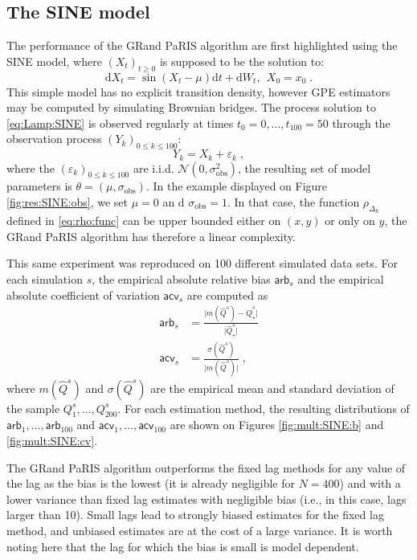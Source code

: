 \documentclass[12pt]{article}
\newcommand{\rmd}{\mathrm{d}}
\newcommand{\eqsp}{\;}
\newcommand{\1}{\mathrm{1}}
\newcommand{\hQ}{\widehat{Q}}
\begin{document}
\subsection*{The SINE model} 
The performance of the GRand PaRIS algorithm are first highlighted using the SINE model, where $(X_t)_{t\geq 0}$ is supposed to be the solution to: 
\begin{equation}
\rmd X_t = \sin \left(X_t-\mu\right)\rmd t + \rmd W_t,~~X_0=x_0\eqsp. \label{eq:Lamp:SINE}
\end{equation}
This simple model has no explicit transition density, however GPE estimators may be computed by simulating Brownian bridges.
The process solution to \eqref{eq:Lamp:SINE} is observed regularly at times $t_0=0,\ldots,t_{100}=50$ through the observation process $(Y_k)_{0\leq k \leq 100}$:
\begin{equation*}
Y_k = X_k + \varepsilon_k\eqsp,
\end{equation*}
where the $(\varepsilon_k)_{0\leq k \leq 100}$ are i.i.d. $\mathcal{N}(0, \sigma^2_\text{obs})$, the resulting set of model parameters is $\theta = (\mu, \sigma_\text{obs})$.
In the example displayed on Figure \ref{fig:res:SINE:obs}, we set $\mu=0$ an d $ \sigma_\text{obs} = 1$.
In that case, the function $\rho_{\Delta_k}$ defined in \eqref{eq:rho:func} can be upper bounded either on $(x,y)$ or only on $y$, the GRand PaRIS algorithm has therefore a linear complexity.


This same experiment was reproduced on 100 different simulated data sets. 
For each simulation $s$, the empirical absolute relative bias $\mathsf{arb}_s$ and the empirical absolute coefficient of variation $\mathsf{acv}_s$ are computed as
\begin{align*}
\mathsf{arb}_s &= \frac{\vert m(\hQ^s)-\hQ^s_\star\vert }{\vert \hQ^s_\star\vert }\\
\mathsf{acv}_s&=\frac{\sigma(\hQ^s)}{\vert m(\hQ^s)\vert }\eqsp,
\end{align*}
where $m(\hQ^s)$ and $\sigma(\hQ^s)$ are the empirical mean and standard deviation of the sample $Q_1^s,\dots,Q_{200}^s$. For each estimation method, the resulting distributions of $\mathsf{arb}_1,\dots,\mathsf{arb}_{100}$ and $\mathsf{acv}_1,\dots,\mathsf{acv}_{100}$  are shown on Figures \ref{fig:mult:SINE:b} and  \ref{fig:mult:SINE:cv}.


The GRand PaRIS algorithm outperforms the fixed lag methods for any value of the lag as the bias is the lowest (it is already negligible for $N=400$) and with a lower variance than fixed lag estimates with negligible bias (i.e., in this case, lags larger than 10). 
Small lags lead to strongly biased estimates for the fixed lag method, and unbiased estimates are at the cost of a large variance. 
It is worth noting here that the lag for which the bias is small is model dependent. 
\end{document}
